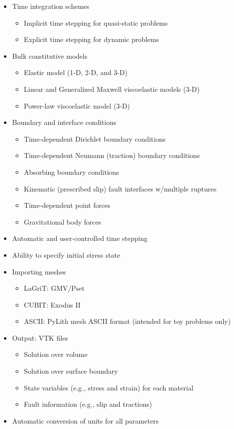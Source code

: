\documentclass[pdftex,cig,slideColor]{pp4slides}
\begin{document}
  \begin{itemize}
  \item Time integration schemes
    \begin{itemize}
    \item Implicit time stepping for quasi-static problems
    \item Explicit time stepping for dynamic problems
    \end{itemize}
  \item Bulk constitutive models
    \begin{itemize}
    \item Elastic model (1-D, 2-D, and 3-D)
    \item Linear and Generalized Maxwell viscoelastic models (3-D)
    \item Power-law viscoelastic model (3-D)
    \end{itemize}
  \item Boundary and interface conditions
    \begin{itemize}
    \item Time-dependent Dirichlet boundary conditions
    \item Time-dependent Neumann (traction) boundary conditions
    \item Absorbing boundary conditions
    \item Kinematic (prescribed slip) fault interfaces w/multiple ruptures
    \item Time-dependent point forces
    \item Gravitational body forces
    \end{itemize}
  \end{itemize}

  \summary{}

  \begin{itemize}
  \item Automatic and user-controlled time stepping
  \item Ability to specify initial stress state
  \item Importing meshes
    \begin{itemize}
    \item LaGriT: GMV/Pset
    \item CUBIT: Exodus II
    \item ASCII: PyLith mesh ASCII format (intended for toy problems only)
    \end{itemize}
  \item Output: VTK files
    \begin{itemize}
    \item Solution over volume
    \item Solution over surface boundary
    \item State variables (e.g., stress and strain) for each material
    \item Fault information (e.g., slip and tractions)
    \end{itemize}
  \item Automatic conversion of units for all parameters
  \end{itemize}
\end{document}
